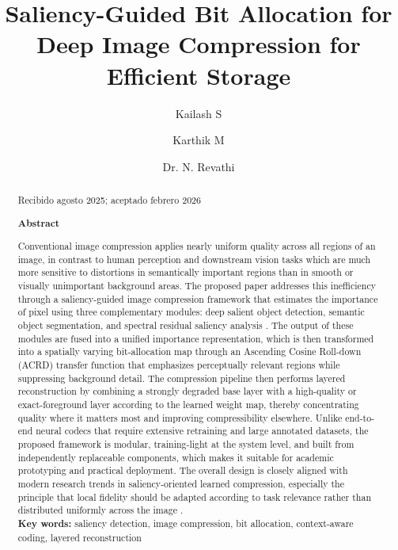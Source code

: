 \documentclass[11pt,                                                             
 superscriptaddress,twoside,
 amsmath,amssymb,
 aps, physrev
]{revtex4-2}
\begin{document}
\title{Saliency-Guided Bit Allocation for Deep Image Compression for Efficient Storage}

\author{Kailash S}

\author{Karthik M}

\author{Dr. N. Revathi}

\begin{abstract}
\begin{center}
    {\scriptsize Recibido agosto 2025; aceptado febrero 2026}
\end{center}
{\fontsize{9pt}{11pt}\selectfont

\centerline{{\bf Abstract}} 
Conventional image compression applies nearly uniform quality across all regions of an image, in contrast to human perception and downstream vision tasks which are much more sensitive to distortions in semantically important regions than in smooth or visually unimportant background areas. The proposed paper addresses this inefficiency through a saliency-guided image compression framework that estimates the importance of pixel using three complementary modules: deep salient object detection, semantic object segmentation, and spectral residual saliency analysis \cite{hou2007ieee}. The output of these modules are fused into a unified importance representation, which is then transformed into a spatially varying bit-allocation map through an Ascending Cosine Roll-down (ACRD) transfer function that emphasizes perceptually relevant regions while suppressing background detail. The compression pipeline then performs layered reconstruction by combining a strongly degraded base layer with a high-quality or exact-foreground layer according to the learned weight map, thereby concentrating quality where it matters most and improving compressibility elsewhere. Unlike end-to-end neural codecs that require extensive retraining and large annotated datasets, the proposed framework is modular, training-light at the system level, and built from independently replaceable components, which makes it suitable for academic prototyping and practical deployment. The overall design is closely aligned with modern research trends in saliency-oriented learned compression, especially the principle that local fidelity should be adapted according to task relevance rather than distributed uniformly across the image \cite{li2024ieee}. \\ 
\textbf{Key words:} saliency detection, image compression, bit allocation, context-aware coding, layered reconstruction

}
\end{abstract}
\end{document}
